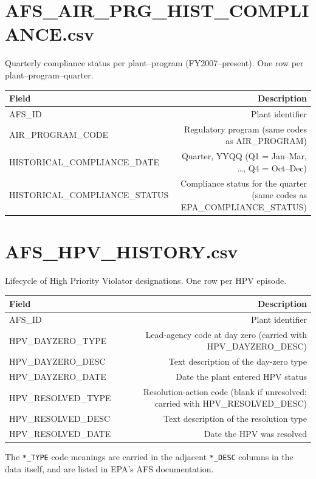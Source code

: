\documentclass[11pt]{article}
\begin{document}
\section*{AFS\_AIR\_PRG\_HIST\_COMPLIANCE.csv}
Quarterly compliance status per plant--program (FY2007--present). One row per plant--program--quarter.
\begin{longtable}{F D}
\toprule
Field & Description \\ \midrule \endhead
AFS\_ID & Plant identifier \\
AIR\_PROGRAM\_CODE & Regulatory program (same codes as AIR\_PROGRAM) \\
HISTORICAL\_COMPLIANCE\_DATE & Quarter, YYQQ (Q1 = Jan--Mar, \dots, Q4 = Oct--Dec) \\
HISTORICAL\_COMPLIANCE\_STATUS & Compliance status for the quarter (same codes as EPA\_COMPLIANCE\_STATUS) \\
\bottomrule
\end{longtable}

\section*{AFS\_HPV\_HISTORY.csv}
Lifecycle of High Priority Violator designations. One row per HPV episode.
\begin{longtable}{F D}
\toprule
Field & Description \\ \midrule \endhead
AFS\_ID & Plant identifier \\
HPV\_DAYZERO\_TYPE & Lead-agency code at day zero (carried with HPV\_DAYZERO\_DESC) \\
HPV\_DAYZERO\_DESC & Text description of the day-zero type \\
HPV\_DAYZERO\_DATE & Date the plant entered HPV status \\
HPV\_RESOLVED\_TYPE & Resolution-action code (blank if unresolved; carried with HPV\_RESOLVED\_DESC) \\
HPV\_RESOLVED\_DESC & Text description of the resolution type \\
HPV\_RESOLVED\_DATE & Date the HPV was resolved \\
\bottomrule
\end{longtable}
\noindent The \texttt{*\_TYPE} code meanings are carried in the adjacent \texttt{*\_DESC} columns in the
data itself, and are listed in EPA's AFS documentation.
\end{document}
